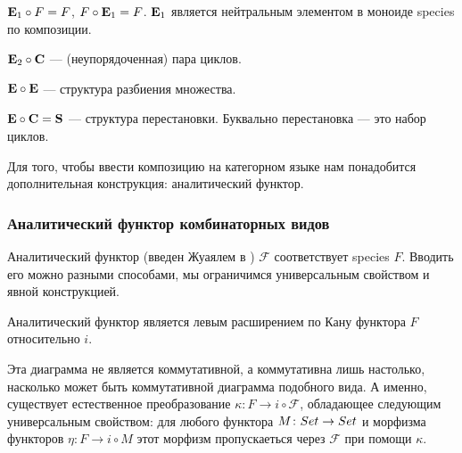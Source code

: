 \begin{example}
$\mathbf E_1 \circ F = F$, $F \circ \mathbf E_1 = F$. $\mathbf E_1$ является нейтральным элементом в
моноиде species по композиции.
\end{example}
\begin{example}
$\mathbf E_2 \circ \mathbf C$ --- (неупорядоченная) пара циклов.
\end{example}
\begin{example}
$\mathbf E \circ \mathbf E$ --- структура разбиения множества.
\end{example}
\begin{example}
$\mathbf E \circ \mathbf C = \mathbf S$ --- структура перестановки.
Буквально перестановка --- это набор циклов.
\end{example}

Для того, чтобы ввести композицию на категорном языке нам
понадобится дополнительная конструкция: аналитический функтор.
\subsubsection{Аналитический функтор комбинаторных видов}
Аналитический функтор (введен Жуаялем в \cite{J2}) $\mathcal F$ соответствует
species $F$. Вводить его можно разными способами, мы ограничимся универсальным
свойством и явной конструкцией. 
\begin{definition}
Аналитический функтор является левым расширением по Кану функтора $F$
относительно $i$.

\end{definition}

Эта диаграмма не является коммутативной, а коммутативна лишь настолько,
насколько может быть коммутативной диаграмма подобного вида. А именно,
существует естественное преобразование  $\kappa \colon F \rightarrow i \circ
\mathcal F$, обладающее следующим универсальным свойством:
для любого функтора $M \colon Set \rightarrow Set$ и морфизма функторов $\eta
\colon F \rightarrow i \circ M$ этот морфизм пропускаеться через $\mathcal F$ при помощи $\kappa$.



